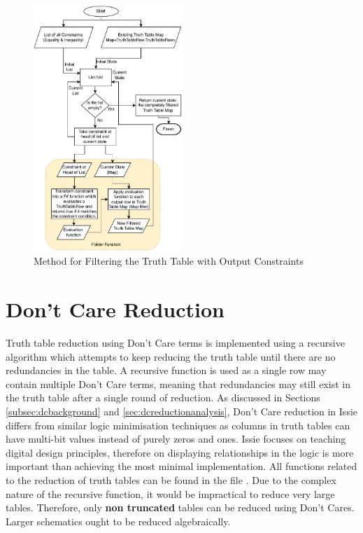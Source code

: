 \begin{figure}
    \centering
    \includegraphics[width=0.5\textwidth]{05.ImpPlan/outputconstraints.pdf}
    \caption{Method for Filtering the Truth Table with Output Constraints}
    \label{fig:outputconsfilter}
\end{figure}

\section{Don't Care Reduction}
Truth table reduction using Don't Care terms is implemented using a recursive algorithm which attempts to keep reducing the truth table until there are no redundancies in the table. A recursive function is used as a single row may contain multiple Don't Care terms, meaning that redundancies may still exist in the truth table after a single round of reduction. As discussed in Sections \ref{subsec:dcbackground} and \ref{sec:dcreductionanalysis}, Don't Care reduction in Issie differs from similar logic minimisation techniques as columns in truth tables can have multi-bit values instead of purely zeros and ones.
Issie focuses on teaching digital design principles, therefore on displaying relationships in the logic is more important than achieving the most minimal implementation. All functions related to the reduction of truth tables can be found in the file .
Due to the complex nature of the recursive function, it would be impractical to reduce very large tables. Therefore, only \textbf{non truncated} tables can be reduced using Don't Cares. Larger schematics ought to be reduced algebraically. 

